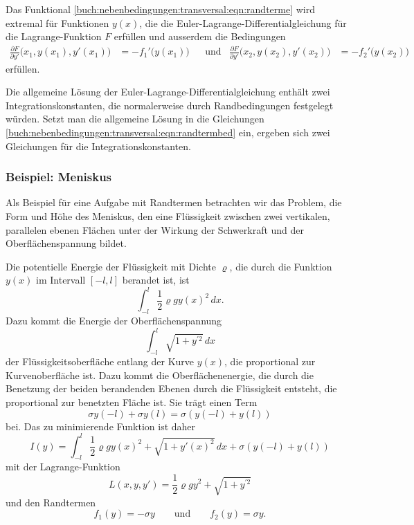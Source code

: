 \begin{satz}
\label{buch:nebenbedingungen:transversal:satz:randterme}
Das Funktional
\eqref{buch:nebenbedingungen:transversal:eqn:randterme}
wird extremal für Funktionen $y(x)$, die die
Euler-La\-gran\-ge-Differentialgleichung für die Lagrange-Funktion $F$ erfüllen
und ausserdem die Bedingungen
\begin{align}
\frac{\partial F}{\partial y'}\bigl(x_1,y(x_1),y'(x_1)) &= -f_1'(y(x_1)\bigr)
&&\text{und}&
\frac{\partial F}{\partial y'}\bigl(x_2,y(x_2),y'(x_2)) &= -f_2'(y(x_2)\bigr)
\label{buch:nebenbedingungen:transversal:eqn:randtermbed}
\end{align}
erfüllen.
\end{satz}

Die allgemeine Lösung der Euler-Lagrange-Differentialgleichung
enthält zwei Integrationskonstanten, die normalerweise durch
Randbedingungen festgelegt würden.
Setzt man die allgemeine Lösung in die Gleichungen
\eqref{buch:nebenbedingungen:transversal:eqn:randtermbed}
ein, ergeben sich zwei Gleichungen für die Integrationskonstanten.

%
%
\subsubsection{Beispiel: Meniskus}
%
Als Beispiel für eine Aufgabe mit Randtermen betrachten wir das
Problem, die Form und Höhe des Meniskus, den eine Flüssigkeit zwischen
zwei vertikalen, parallelen ebenen Flächen unter der Wirkung der
Schwerkraft und der Oberflächenspannung bildet.
%
%

Die potentielle Energie der Flüssigkeit mit Dichte $\varrho$, die 
%
durch die Funktion $y(x)$ im Intervall $[-l,l]$ berandet ist, ist
\[
\int_{-l}^l
\frac12
\varrho
g
y(x)^2
\,dx.
\]
Dazu kommt die Energie der Oberflächenspannung
\[
\int_{-l}^l \sqrt{1+y^{\prime 2}}\,dx
\]
der Flüssigkeitsoberfläche entlang der Kurve $y(x)$, die 
proportional zur Kurvenoberfläche ist.
Dazu kommt die Oberflächenenergie, die durch die Benetzung der
beiden berandenden Ebenen durch die Flüssigkeit entsteht, die
proportional zur benetzten Fläche ist. 
Sie trägt einen Term
\[
\sigma y(-l) + \sigma y(l)
=
\sigma(y(-l)+y(l))
\]
bei.
Das zu minimierende Funktion ist daher
\[
I(y)
=
\int_{-l}^l
\frac12\varrho g y(x)^2
+
\sqrt{1+y'(x)^2}
\,dx
+
\sigma(y(-l)+y(l))
\]
mit der Lagrange-Funktion
\[
L(x,y,y')
=
\frac12\varrho g y^2
+
\sqrt{1+y^{\prime 2}}
\]
und den Randtermen
\[
f_1(y) = -\sigma y
\qquad\text{und}\qquad
f_2(y) = \sigma y.
\]

